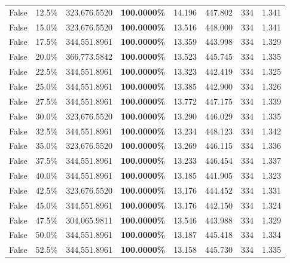 \begin{table}[H]
\begin{tabular}{lllrllll}
\cline{1-8}
False & 12.5\% & 323,676.5520 & \bfseries \color{red} 100.0000\% & 14.196 & 447.802 & 334 & 1.341 \\
\cline{1-8}
False & 15.0\% & 323,676.5520 & \bfseries \color{red} 100.0000\% & 13.516 & 448.000 & 334 & 1.341 \\
\cline{1-8}
False & 17.5\% & 344,551.8961 & \bfseries \color{red} 100.0000\% & 13.359 & 443.998 & 334 & 1.329 \\
\cline{1-8}
False & 20.0\% & 366,773.5842 & \bfseries \color{red} 100.0000\% & 13.523 & 445.745 & 334 & 1.335 \\
\cline{1-8}
False & 22.5\% & 344,551.8961 & \bfseries \color{red} 100.0000\% & 13.323 & 442.419 & 334 & 1.325 \\
\cline{1-8}
False & 25.0\% & 344,551.8961 & \bfseries \color{red} 100.0000\% & 13.385 & 442.900 & 334 & 1.326 \\
\cline{1-8}
False & 27.5\% & 344,551.8961 & \bfseries \color{red} 100.0000\% & 13.772 & 447.175 & 334 & 1.339 \\
\cline{1-8}
False & 30.0\% & 323,676.5520 & \bfseries \color{red} 100.0000\% & 13.290 & 446.029 & 334 & 1.335 \\
\cline{1-8}
False & 32.5\% & 344,551.8961 & \bfseries \color{red} 100.0000\% & 13.234 & 448.123 & 334 & 1.342 \\
\cline{1-8}
False & 35.0\% & 323,676.5520 & \bfseries \color{red} 100.0000\% & 13.269 & 446.115 & 334 & 1.336 \\
\cline{1-8}
False & 37.5\% & 344,551.8961 & \bfseries \color{red} 100.0000\% & 13.233 & 446.454 & 334 & 1.337 \\
\cline{1-8}
False & 40.0\% & 344,551.8961 & \bfseries \color{red} 100.0000\% & 13.185 & 441.905 & 334 & 1.323 \\
\cline{1-8}
False & 42.5\% & 323,676.5520 & \bfseries \color{red} 100.0000\% & 13.176 & 444.452 & 334 & 1.331 \\
\cline{1-8}
False & 45.0\% & 344,551.8961 & \bfseries \color{red} 100.0000\% & 13.176 & 442.150 & 334 & 1.324 \\
\cline{1-8}
False & 47.5\% & 304,065.9811 & \bfseries \color{red} 100.0000\% & 13.546 & 443.988 & 334 & 1.329 \\
\cline{1-8}
False & 50.0\% & 344,551.8961 & \bfseries \color{red} 100.0000\% & 13.187 & 445.418 & 334 & 1.334 \\
\cline{1-8}
False & 52.5\% & 344,551.8961 & \bfseries \color{red} 100.0000\% & 13.158 & 445.730 & 334 & 1.335 \\

\end{tabular}
\end{table}

